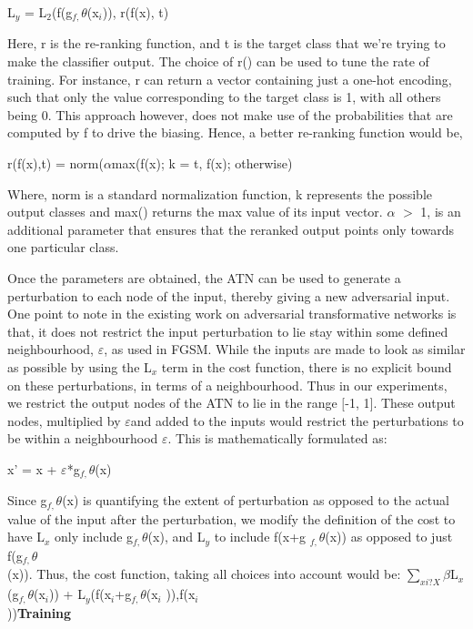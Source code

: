 \documentclass[12pt,a4paper]{article}
\begin{document}
L$_{y}$ = L$_{2}$(f(g$_{f,}$$\theta $(x$_{i}$)), 
r(f(x), t)



Here, r is the re-ranking function, and t is the target class that we're 
trying to make the classifier output. The choice of r() can be used to 
tune the rate of training. For instance, r can return a vector 
containing just a one-hot encoding, such that only the value 
corresponding to the target class is 1, with all others being 0. This 
approach however, does not make use of the probabilities that are 
computed by f to drive the biasing. Hence, a better re-ranking function 
would be,

r(f(x),t) = norm($\alpha $max(f(x); k = t, f(x); otherwise)



Where, norm is a standard normalization function, k represents the 
possible output classes and max() returns the max value of its input 
vector. $\alpha $ $>$ 1, is an additional parameter that ensures that 
the reranked output points only towards one particular class.



Once the parameters are obtained, the ATN can be used to generate a 
perturbation to each node of the input, thereby giving a new adversarial 
input. One point to note in the existing work on adversarial 
transformative networks is that, it does not restrict the input 
perturbation to lie stay within some defined neighbourhood, $
\varepsilon $, as used in FGSM. While the inputs are made to look as 
similar as possible by using the L$_{x}$ term in the cost function, 
there is no explicit bound on these perturbations, in terms of a 
neighbourhood. Thus in our experiments, we restrict the output nodes of 
the ATN to lie in the range $[$-1, 1$]$. These output nodes, multiplied 
by $\varepsilon $and added to the inputs would restrict the 
perturbations to be within a neighbourhood $\varepsilon $. This is 
mathematically formulated as:



x' = x + $\varepsilon $*g$_{f,}$$\theta $(x)



Since g$_{f,}$$\theta $(x) is quantifying the extent of 
perturbation as opposed to the actual value of the input after the 
perturbation, we modify the definition of the cost to have L$_{x}$ 
only include g$_{f,}$$\theta $(x), and L$_{y}$ to include f(x+g
$_{f,}$$\theta $(x)) as opposed to just f(g$_{f,}$$\theta $\\
(x)). Thus, the cost function, taking all choices into account would be:
$\sum_{xi ?X}{}$$\beta $L$_{x}$(g$_{f,}$$\theta $(x$_{i
}$)) + L$_{y}$(f(x$_{i}$+g$_{f,}$$\theta $(x$_{i}$
)),f(x$_{i}$\\
))\textbf{Training}
\end{document}
